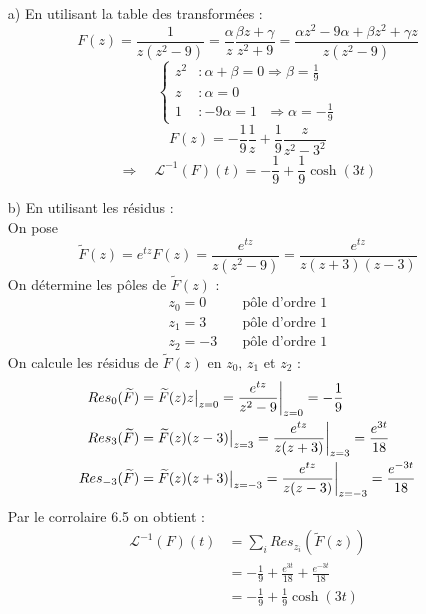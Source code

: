 \begin{itemize}
    \item[a)] En utilisant la table des transformées :
    $$F(z) = \frac{1}{z(z^2-9)} = \frac{\alpha}{z} \frac{\beta z + \gamma}{z^2+9} = \frac{\alpha z^2 - 9 \alpha + \beta z^2 + \gamma z}{z(z^2-9)}$$
    $$
    \begin{cases}
        z^2 &: \alpha + \beta = 0 \Rightarrow \beta = \frac{1}{9} \\
        z &: \alpha = 0 \\
        1 &: -9 \alpha = 1 \text{ } \Rightarrow \alpha = -\frac{1}{9}
    \end{cases}
    $$
    $$F(z) = -\frac{1}{9} \frac{1}{z} + \frac{1}{9} \frac{z}{z^2-3^2}$$
    $$\Rightarrow \quad \mathcal{L}^{-1}(F)(t) = -\frac{1}{9} + \frac{1}{9} \cosh(3t)$$
    \item[b)] En utilisant les résidus : \\
    On pose
    $$\widetilde{F}(z) = e^{tz}F(z) = \frac{e^{tz}}{z(z^2-9)} = \frac{e^{tz}}{z(z+3)(z-3)}$$
    On détermine les pôles de $\widetilde{F}(z)$ :
    \begin{align*}
        z_0 = 0 \quad &\text{pôle d'ordre 1} \\
        z_1 = 3 \quad &\text{pôle d'ordre 1} \\
        z_2 = -3 \quad &\text{pôle d'ordre 1}
    \end{align*}
    On calcule les résidus de $\widetilde{F}(z)$ en $z_0$, $z_1$ et $z_2$ :
    \begin{align*}
        Res_0(\widetilde{F}) &= \widetilde{F}(z)z \big{|}_{z=0} = \frac{e^{tz}}{z^2-9} \bigg{|}_{z=0} = -\frac{1}{9} \\
        Res_3(\widetilde{F}) &= \widetilde{F}(z)(z-3) \big{|}_{z=3} = \frac{e^{tz}}{z(z+3)} \bigg{|}_{z=3} = \frac{e^{3t}}{18} \\
        Res_{-3}(\widetilde{F}) &= \widetilde{F}(z)(z+3) \big{|}_{z=-3} = \frac{e^{tz}}{z(z-3)} \bigg{|}_{z=-3} = \frac{e^{-3t}}{18}
    \end{align*}
    Par le corrolaire 6.5 on obtient :
    \begin{align*}
        \mathcal{L}^{-1}(F)(t) &= \sum_{i} Res_{z_i}(\widetilde{F}(z)) \\
        &= -\frac{1}{9} + \frac{e^{3t}}{18} + \frac{e^{-3t}}{18} \\
        &= -\frac{1}{9} + \frac{1}{9} \cosh(3t)
    \end{align*}
\end{itemize}